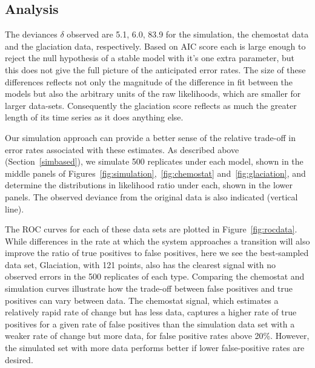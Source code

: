 \documentclass[authoryear,review,11pt]{elsarticle}
\begin{document}
\subsection*{Analysis}
The deviances $\delta$ observed are 5.1, 6.0, 83.9 for the simulation,
the chemostat data and the glaciation data, respectively.
Based on AIC score each is large enough to reject the null hypothesis of a stable model 
with it's one extra parameter, but this does not give the full picture of the anticipated error rates.  
The size of these differences reflects not only the magnitude of the difference in fit
between the models but also the arbitrary units of the raw likelihoods,
which are smaller for larger data-sets.
Consequently the glaciation score reflects as much the greater length of its time series as it does anything else.
 

Our simulation approach can provide a better sense of the relative trade-off in error rates associated
with these estimates.  
As described above (Section~\ref{simbased}), we simulate 500 replicates under each model, 
shown in the middle panels of Figures~\ref{fig:simulation},~\ref{fig:chemostat} and~\ref{fig:glaciation},
and determine the distributions in likelihood ratio under each, shown in the lower panels.  
The observed deviance from the original data is also indicated (vertical line).

The ROC curves for each of these data sets are plotted in Figure~\ref{fig:rocdata}.  
While differences in the rate at which the system approaches a transition will also 
improve the ratio of true positives to false positives, 
here we see the best-sampled data set, Glaciation, with 121 points, 
also has the clearest signal with no observed errors in the 500 replicates of each type.   
Comparing the chemostat and simulation curves illustrate how the trade-off between
false positives and true positives can vary between data.  The chemostat signal, 
which estimates a relatively rapid rate of change but has less data, captures a higher
rate of true positives for a given rate of false positives than the simulation data
set with a weaker rate of change but more data, for false positive rates above 20\%.  
However, the simulated set with more data performs better if lower false-positive rates
are desired.  


\end{document}
